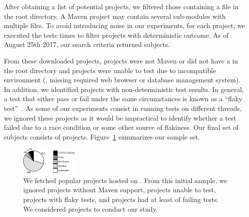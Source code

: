 After obtaining a list of potential projects, we filtered those
containing a \pomf{} file in the root directory.  A Maven project may
contain several sub-modules with multiple \pomf{} files.
To avoid introducing noise in our experiments, for each project, we
executed the tests \SubjectsReruns{} times to filter projects with
deterministic outcome.
As of August 25th 2017, our search criteria returned \SubjectsGithub{}
subjects.

From these \SubjectsGithub{} downloaded projects,
\SubjectsGithubNotMaven{} projects were not Maven or did not have a
\pomf{} in the root directory and \SubjectsGithubNotTestable{}
projects were unable to test due to incompatible environment (\eg,
missing required web browser or database management system).
In addition, we identified \SubjectsGithubFlaky{} projects with
non-deterministic test results.
In general, a test that either pass or fail under the same circumstances
is known as a ``flaky test''~\cite{luo-etal-fse2014}.
As some of our experiments consist in running tests on different
threads, we ignored these projects as it would be impractical
to identify whether a test failed due to a race condition or some
other source of flakiness.
Our final set of subjects consists of \numSubjs{} projects.
Figure~\ref{fig:subjects} summarizes our sample set.

\begin{figure}[ht]
  \centering
  \includegraphics[width=0.25\textwidth]{results/piechart-subjs.pdf}
  \caption{\label{fig:subjects}We fetched \SubjectsGithub{} popular projects
  hosted on \github{}. From this initial sample, we ignored
  \SubjectsGithubNotMaven{} projects without Maven support,
  \SubjectsGithubNotTestable{} projects unable to test,
  \SubjectsGithubFlaky{} projects with flaky tests, and
  \SubjectsGithubTooManyFailures{} projects had at least
  \SuiteFailingThreshold{} of failing tests. We considered
  \numSubjs{} projects to conduct our study.}
\end{figure}

